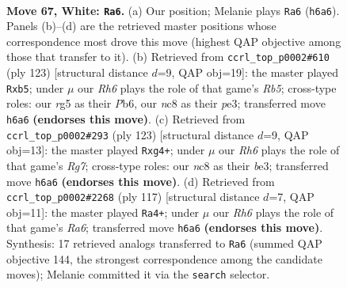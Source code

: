 \documentclass[11pt]{article}
\begin{document}
\clearpage

\begin{figure}[p]\centering
\begin{subfigure}{0.46\textwidth}\centering
\resizebox{\linewidth}{!}{%
\newchessgame
\chessboard[
  setfen={2nk4/8/7R/6rp/p7/P7/7K/8 w - - 11 67},
  showmover=false,
  pgfstyle=straightmove, color=movearrow, markmove={h6-a6}
]}
\caption{}
\end{subfigure}\hfill
\begin{subfigure}{0.46\textwidth}\centering
\resizebox{\linewidth}{!}{%
\newchessgame
\chessboard[
  setfen={8/8/1p2k3/1P6/1r6/3KP1R1/8/8 b - - 1 62},
  showmover=false,
  pgfstyle=straightmove, color=movearrow, markmove={b4-b5}
]}
\caption{}
\end{subfigure}
\\[4pt]
\begin{subfigure}{0.46\textwidth}\centering
\resizebox{\linewidth}{!}{%
\newchessgame
\chessboard[
  setfen={8/3k4/R7/1p6/4K1Pp/P3B3/6r1/8 b - - 0 62},
  showmover=false,
  pgfstyle=straightmove, color=movearrow, markmove={g2-g4}
]}
\caption{}
\end{subfigure}\hfill
\begin{subfigure}{0.46\textwidth}\centering
\resizebox{\linewidth}{!}{%
\newchessgame
\chessboard[
  setfen={3k4/1R6/7p/P7/5KP1/r7/8/8 b - - 0 59},
  showmover=false,
  pgfstyle=straightmove, color=movearrow, markmove={a3-a4}
]}
\caption{}
\end{subfigure}
\caption{\textbf{Move 67, White: \texttt{Ra6}.} (a) Our position; Melanie plays \texttt{Ra6} (\texttt{h6a6}). Panels (b)--(d) are the retrieved master positions whose correspondence most drove this move (highest QAP objective among those that transfer to it). (b) Retrieved from \texttt{ccrl\_top\_p0002\#610} (ply 123) [structural distance $d$=9, QAP obj=19]: the master played \texttt{Rxb5}; under $\mu$ our \emph{Rh6} plays the role of that game's \emph{Rb5}; cross-type roles: our \emph{r}g5 as their \emph{P}b6, our \emph{n}c8 as their \emph{p}e3; transferred move \texttt{h6a6} \textbf{(endorses this move)}. (c) Retrieved from \texttt{ccrl\_top\_p0002\#293} (ply 123) [structural distance $d$=9, QAP obj=13]: the master played \texttt{Rxg4+}; under $\mu$ our \emph{Rh6} plays the role of that game's \emph{Rg7}; cross-type roles: our \emph{n}c8 as their \emph{b}e3; transferred move \texttt{h6a6} \textbf{(endorses this move)}. (d) Retrieved from \texttt{ccrl\_top\_p0002\#2268} (ply 117) [structural distance $d$=7, QAP obj=11]: the master played \texttt{Ra4+}; under $\mu$ our \emph{Rh6} plays the role of that game's \emph{Ra6}; transferred move \texttt{h6a6} \textbf{(endorses this move)}. Synthesis: 17 retrieved analogs transferred to \texttt{Ra6} (summed QAP objective 144, the strongest correspondence among the candidate moves); Melanie committed it via the \texttt{search} selector.}
\label{fig:thought-m132}
\end{figure}
\end{document}
